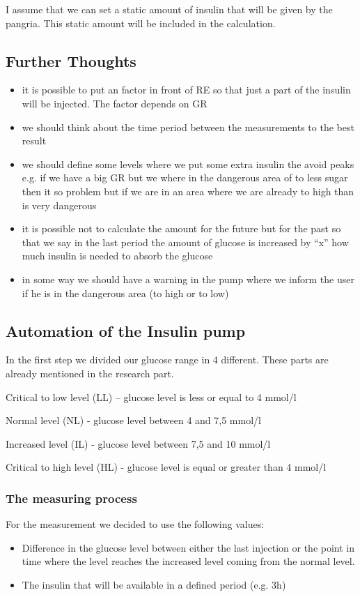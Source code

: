 I assume that we can set a static amount of insulin that will be given by the
pangria. This static amount will be included in the calculation.

\subsection{Further Thoughts}
\begin{itemize}
  \item it is possible to put an factor in front of RE so that just a part of
  the insulin will be injected. The factor depends on GR
  \item we should think about the time period between the measurements to the
  best result
  \item we should define some levels where we put some extra insulin the avoid
  peaks e.g. if we have a big GR but we where in the dangerous area of to less
  sugar then it so problem but if we are in an area where we are already to
  high than is very dangerous
  \item it is possible not to calculate the amount for the future but for the
  past so that we say in the last period the amount of glucose is increased  by
  ``x'' how much insulin is needed to absorb the glucose
  \item in some way we should have a warning in the pump where we inform the
  user if he is in the dangerous area (to high or to low)
\end{itemize}

\subsection{Automation of the Insulin pump}
In the first step we divided our glucose range in 4 different. These parts are already mentioned in the research part.

Critical to low level (LL) – glucose level is less or equal to 4 mmol/l

Normal  level (NL) - glucose level between 4 and 7,5 mmol/l

Increased level (IL) - glucose level between 7,5 and 10 mmol/l

Critical to high level (HL) - glucose level is equal or greater than 4 mmol/l

\subsubsection{The measuring process}
For the measurement we decided to use the following values:
\begin{itemize}
  \item Difference in the glucose level between either the last injection or
  the point in time where the level reaches the increased level coming from the normal level.
  \item The insulin that will be available in a defined period (e.g. 3h) 
\end{itemize}

